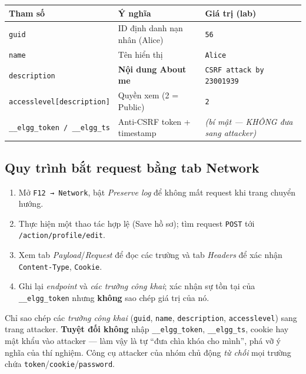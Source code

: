 \documentclass[11pt,a4paper]{article}
\begin{document}
\begin{center}\small
\begin{tabularx}{\linewidth}{@{}l Y l@{}}
\toprule
\textbf{Tham số} & \textbf{Ý nghĩa} & \textbf{Giá trị (lab)}\\
\midrule
\texttt{guid} & ID định danh nạn nhân (Alice) & \texttt{56}\\
\texttt{name} & Tên hiển thị & \texttt{Alice}\\
\texttt{description} & \textbf{Nội dung About me} & \texttt{CSRF attack by 23001939}\\
\texttt{accesslevel[description]} & Quyền xem (2 = Public) & \texttt{2}\\
\texttt{\_\_elgg\_token / \_\_elgg\_ts} & Anti-CSRF token + timestamp & \emph{(bí mật — KHÔNG đưa sang attacker)}\\
\bottomrule
\end{tabularx}
\end{center}

\subsection{Quy trình bắt request bằng tab Network}
\begin{enumerate}
  \item Mở \texttt{F12 → Network}, bật \emph{Preserve log} để không mất request khi trang chuyển hướng.
  \item Thực hiện một thao tác hợp lệ (Save hồ sơ); tìm request \texttt{POST} tới \texttt{/action/profile/edit}.
  \item Xem tab \emph{Payload}/\emph{Request} để đọc các trường và tab \emph{Headers} để xác nhận \texttt{Content-Type}, \texttt{Cookie}.
  \item Ghi lại \emph{endpoint} và \emph{các trường công khai}; xác nhận sự tồn tại của \texttt{\_\_elgg\_token} nhưng \textbf{không} sao chép giá trị của nó.
\end{enumerate}

\begin{warnbox}
Chỉ sao chép các \emph{trường công khai} (\texttt{guid}, \texttt{name}, \texttt{description}, \texttt{accesslevel}) sang trang attacker. \textbf{Tuyệt đối không} nhập \texttt{\_\_elgg\_token}, \texttt{\_\_elgg\_ts}, cookie hay mật khẩu vào attacker — làm vậy là tự ``đưa chìa khóa cho mình'', phá vỡ ý nghĩa của thí nghiệm. Công cụ attacker của nhóm chủ động \emph{từ chối} mọi trường chứa \texttt{token}/\texttt{cookie}/\texttt{password}.
\end{warnbox}
\end{document}
